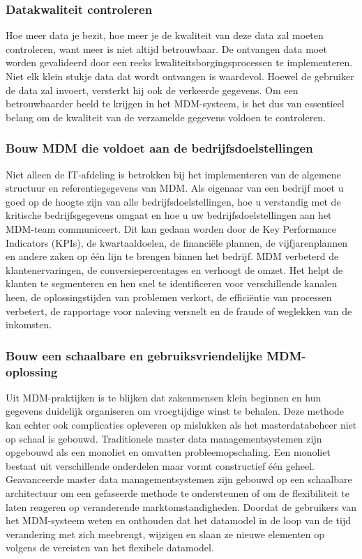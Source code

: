 \subsubsection{Datakwaliteit controleren}
Hoe meer data je bezit, hoe meer je de kwaliteit van deze data zal moeten controleren, want meer is niet altijd betrouwbaar. De ontvangen data moet worden gevalideerd door een reeks kwaliteitsborgingsprocessen te implementeren. Niet elk klein stukje data dat wordt ontvangen is waardevol. Hoewel de gebruiker de data zal invoert, versterkt hij ook de verkeerde gegevens. Om een betrouwbaarder beeld te krijgen in het MDM-systeem, is het dus van essentieel belang om de kwaliteit van de verzamelde gegevens voldoen te controleren. 

\subsubsection{Bouw MDM die voldoet aan de bedrijfsdoelstellingen}
Niet alleen de IT-afdeling is betrokken bij het implementeren van de algemene structuur en referentiegegevens van MDM. Als eigenaar van een bedrijf moet u goed op de hoogte zijn van alle bedrijfsdoelstellingen, hoe u verstandig met de kritische bedrijfsgegevens omgaat en hoe u uw bedrijfsdoelstellingen aan het MDM-team communiceert. Dit kan gedaan worden door de Key Performance Indicators (KPIs), de kwartaaldoelen, de financiële plannen, de vijfjarenplannen en andere zaken op één lijn te brengen binnen het bedrijf. MDM verbeterd de klantenervaringen, de conversiepercentages en verhoogt de omzet. Het helpt de klanten te segmenteren en hen snel te identificeren voor verschillende kanalen heen, de oplossingstijden van problemen verkort, de efficiëntie van processen verbetert, de rapportage voor naleving versnelt en de fraude of weglekken van de inkomsten.

\subsubsection{Bouw een schaalbare en gebruiksvriendelijke MDM-oplossing}
Uit MDM-praktijken is te blijken dat zakenmensen klein beginnen en hun gegevens duidelijk organiseren om vroegtijdige winst te behalen. Deze methode kan echter ook complicaties opleveren op mislukken als het masterdatabeheer niet op schaal is gebouwd.
Traditionele master data managementsystemen zijn opgebouwd als een monoliet en omvatten probleemopschaling. Een monoliet bestaat uit verschillende onderdelen maar vormt constructief één geheel. Geavanceerde master data managementsystemen zijn gebouwd op een schaalbare architectuur om een gefaseerde methode te ondersteunen of om de flexibiliteit te laten reageren op veranderende marktomstandigheden. 
Doordat de gebruikers van het MDM-systeem weten en onthouden dat het datamodel in de loop van de tijd verandering met zich meebrengt, wijzigen en slaan ze nieuwe elementen op volgens de vereisten van het flexibele datamodel.

